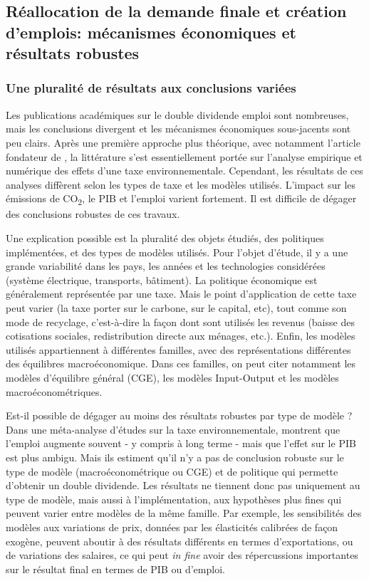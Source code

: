 \subsection{Réallocation de la demande finale et création d'emplois: mécanismes économiques et résultats robustes}

\subsubsection{Une pluralité de résultats aux conclusions variées}

Les publications académiques sur le double dividende emploi sont nombreuses, mais les conclusions divergent et les mécanismes économiques sous-jacents sont peu clairs.
Après une première approche plus théorique, avec notamment l'article fondateur de \citet{Bovenberg1994a}, la littérature s'est essentiellement portée sur l'analyse empirique et numérique des effets d'une taxe environnementale. 
Cependant, les résultats de ces analyses diffèrent selon les types de taxe et les modèles utilisés. L'impact sur les émissions de CO\textsubscript{2}, le PIB et l'emploi varient fortement. Il est difficile de dégager des conclusions robustes de ces travaux. 

Une explication possible est la pluralité des objets étudiés, des politiques implémentées, et des types de modèles utilisés.
Pour l'objet d'étude, il y a une grande variabilité dans les pays, les années et les technologies considérées (système électrique, transports, bâtiment). 
La politique économique est généralement représentée par une taxe. Mais le point d'application de cette taxe peut varier (la taxe porter sur le carbone, sur le capital, etc), tout comme son mode de recyclage, c'est-à-dire la façon dont sont utilisés les revenus (baisse des cotisations sociales, redistribution directe aux ménages, etc.).
Enfin, les modèles utilisés appartiennent à différentes familles, avec des représentations différentes des équilibres macroéconomique. Dans ces familles, on peut citer notamment les modèles d'équilibre général (CGE), les modèles Input-Output et les modèles macroéconométriques.

Est-il possible de dégager au moins des résultats robustes par type de modèle ? 
Dans une méta-analyse d'études sur la taxe environnementale, \citet{Patuelli2005} montrent que l'emploi augmente souvent - y compris à long terme - mais que l'effet sur le PIB est plus ambigu. Mais ils estiment qu'il n'y a pas de conclusion robuste sur le type de modèle (macroéconométrique ou CGE) et de politique qui permette d'obtenir un double dividende. Les résultats ne tiennent donc pas uniquement au type de modèle, mais aussi à l'implémentation, aux hypothèses plus fines qui peuvent varier entre modèles de la même famille. Par exemple, les sensibilités des modèles aux variations de prix, données par les élasticités calibrées de façon exogène, peuvent aboutir à des résultats différents en termes d'exportations, ou de variations des salaires, ce qui peut \textit{in fine} avoir des répercussions importantes sur le résultat final en termes de PIB ou d'emploi.



